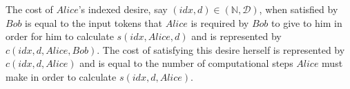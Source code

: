 \begin{definition}
  The cost of $Alice$'s indexed desire, say $\left(idx, d\right) \in \left(\mathbb{N}, \mathcal{D}\right)$, when satisfied by
  $Bob$ is equal to the input tokens that $Alice$ is required by $Bob$ to give to him in order for him to calculate
  $s\left(idx, Alice, d\right)$ and is represented by $c\left(idx, d, Alice, Bob\right)$. The cost of satisfying this desire
  herself is represented by $c\left(idx, d, Alice\right)$ and is equal to the number of computational steps $Alice$ must make
  in order to calculate $s\left(idx, d, Alice\right)$.
\end{definition}

